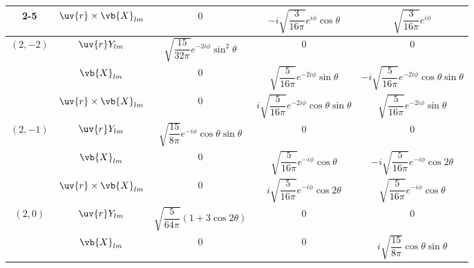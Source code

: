 \begin{longtable}{ccccc}
	\cmidrule(lr){2-5}
	          & \(\uv{r}\times\vb{X}_{lm}\) & \(0\)                                                     & \(-i\sqrt{\dfrac{3}{16\pi}}e^{i\phi}\cos\theta\)            & \(\sqrt{\dfrac{3}{16\pi}}e^{i\phi}\)                         \\
	\midrule
	\multirow{3}{*}{\((2,-2)\)}
	          & \(\uv{r}Y_{lm}\)            & \(\sqrt{\dfrac{15}{32\pi}}e^{-2i\phi}\sin^2\theta\)       & \(0\)                                                       & \(0\)                                                        \\
	\cmidrule(lr){2-5}
	          & \(\vb{X}_{lm}\)             & \(0\)                                                     & \(\sqrt{\dfrac{5}{16\pi}}e^{-2i\phi}\sin\theta\)            & \(-i\sqrt{\dfrac{5}{16\pi}}e^{-2i\phi}\cos\theta\sin\theta\) \\
	\cmidrule(lr){2-5}
	          & \(\uv{r}\times\vb{X}_{lm}\) & \(0\)                                                     & \(i\sqrt{\dfrac{5}{16\pi}}e^{-2i\phi}\cos\theta\sin\theta\) & \(\sqrt{\dfrac{5}{16\pi}}e^{-2i\phi}\sin\theta\)             \\
	\midrule
	\multirow{3}{*}{\((2,-1)\)}
	          & \(\uv{r}Y_{lm}\)            & \(\sqrt{\dfrac{15}{8\pi}}e^{-i\phi}\cos\theta\sin\theta\) & \(0\)                                                       & \(0\)                                                        \\
	\cmidrule(lr){2-5}
	          & \(\vb{X}_{lm}\)             & \(0\)                                                     & \(\sqrt{\dfrac{5}{16\pi}}e^{-i\phi}\cos\theta\)             & \(-i\sqrt{\dfrac{5}{16\pi}}e^{-i\phi}\cos2\theta\)           \\
	\cmidrule(lr){2-5}
	          & \(\uv{r}\times\vb{X}_{lm}\) & \(0\)                                                     & \(i\sqrt{\dfrac{5}{16\pi}}e^{-i\phi}\cos2\theta\)           & \(\sqrt{\dfrac{5}{16\pi}}e^{-i\phi}\cos\theta\)              \\
	\midrule
	\multirow{3}{*}{\((2,0)\)}
	          & \(\uv{r}Y_{lm}\)            & \(\sqrt{\dfrac{5}{64\pi}}\left(1+3\cos2\theta\right)\)    & \(0\)                                                       & \(0\)                                                        \\
	\cmidrule(lr){2-5}
	          & \(\vb{X}_{lm}\)             & \(0\)                                                     & \(0\)                                                       & \(i\sqrt{\dfrac{15}{8\pi}}\cos\theta\sin\theta\)             \\

\end{longtable}
